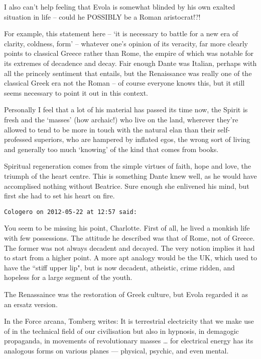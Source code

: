 \begin{footnotesize}
\begin{sffamily}
I also can't help feeling that Evola is somewhat blinded by his own exalted situation in life – could he POSSIBLY be a Roman aristocrat!?!

For example, this statement here – `it is necessary to battle for a new era of clarity, coldness, form’ – whatever one's opinion of its veracity, far more clearly points to classical Greece rather than Rome, the empire of which was notable for its extremes of decadence and decay. Fair enough Dante was Italian, perhaps with all the princely sentiment that entails, but the Renaissance was really one of the classical Greek era not the Roman – of course everyone knows this, but it still seems necessary to point it out in this context.

Personally I feel that a lot of his material has passed its time now, the Spirit is fresh and the `masses' (how archaic!) who live on the land, wherever they're allowed to tend to be more in touch with the natural elan than their self-professed superiors, who are hampered by inflated egos, the wrong sort of living and generally too much `knowing' of the kind that comes from books. 

Spiritual regeneration comes from the simple virtues of faith, hope and love, the triumph of the heart centre. This is something Dante knew well, as he would have accomplised nothing without Beatrice. Sure enough she enlivened his mind, but first she had to set his heart on fire.


\hfill

\texttt{Cologero on 2012-05-22 at 12:57 said: }

You seem to be missing his point, Charlotte. First of all, he lived a monkish life with few possessions. The attitude he described was that of Rome, not of Greece. The former was not always decadent and decayed. The very notion implies it had to start from a higher point. A more apt analogy would be the UK, which used to have the ``stiff upper lip", but is now decadent, atheistic, crime ridden, and hopeless for a large segment of the youth.

The Renassaince was the restoration of Greek culture, but Evola regarded it as an ersatz version.

In the Force arcana, Tomberg writes: It is terrestrial electricity that we make use of in the technical field of our civilisation but also in hypnosis, in demagogic propaganda, in movements of revolutionary masses … for electrical energy has its analogous forms on various planes — physical, psychic, and even mental.


\end{sffamily}
\end{footnotesize}
